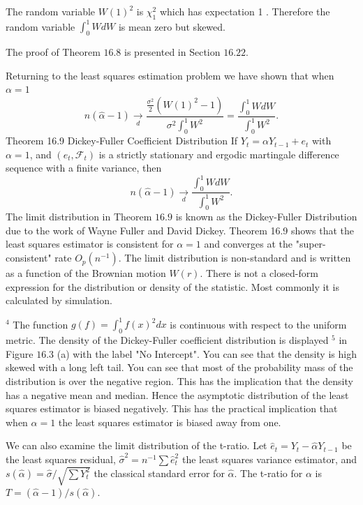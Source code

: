 \documentclass[10pt]{article}
\begin{document}
The random variable $W(1)^{2}$ is $\chi_{1}^{2}$ which has expectation 1 . Therefore the random variable $\int_{0}^{1} W d W$ is mean zero but skewed.

The proof of Theorem $16.8$ is presented in Section $16.22$.

Returning to the least squares estimation problem we have shown that when $\alpha=1$
$$
n(\widehat{\alpha}-1) \underset{d}{\longrightarrow} \frac{\frac{\sigma^{2}}{2}\left(W(1)^{2}-1\right)}{\sigma^{2} \int_{0}^{1} W^{2}}=\frac{\int_{0}^{1} W d W}{\int_{0}^{1} W^{2}} .
$$
Theorem 16.9 Dickey-Fuller Coefficient Distribution If $Y_{t}=\alpha Y_{t-1}+e_{t}$ with $\alpha=1$, and $\left(e_{t}, \mathscr{F}_{t}\right)$ is a strictly stationary and ergodic martingale difference sequence with a finite variance, then
$$
n(\widehat{\alpha}-1) \underset{d}{\longrightarrow} \frac{\int_{0}^{1} W d W}{\int_{0}^{1} W^{2}} .
$$
The limit distribution in Theorem $16.9$ is known as the Dickey-Fuller Distribution due to the work of Wayne Fuller and David Dickey. Theorem 16.9 shows that the least squares estimator is consistent for $\alpha=1$ and converges at the "super-consistent" rate $O_{p}\left(n^{-1}\right)$. The limit distribution is non-standard and is written as a function of the Brownian motion $W(r)$. There is not a closed-form expression for the distribution or density of the statistic. Most commonly it is calculated by simulation.

${ }^{4}$ The function $g(f)=\int_{0}^{1} f(x)^{2} d x$ is continuous with respect to the uniform metric. The density of the Dickey-Fuller coefficient distribution is displayed ${ }^{5}$ in Figure $16.3$ (a) with the label "No Intercept". You can see that the density is high skewed with a long left tail. You can see that most of the probability mass of the distribution is over the negative region. This has the implication that the density has a negative mean and median. Hence the asymptotic distribution of the least squares estimator is biased negatively. This has the practical implication that when $\alpha=1$ the least squares estimator is biased away from one.

We can also examine the limit distribution of the t-ratio. Let $\widehat{e}_{t}=Y_{t}-\widehat{\alpha} Y_{t-1}$ be the least squares residual, $\widehat{\sigma}^{2}=n^{-1} \sum \widehat{e}_{t}^{2}$ the least squares variance estimator, and $s(\widehat{\alpha})=\widehat{\sigma} / \sqrt{\sum Y_{t}^{2}}$ the classical standard error for $\widehat{\alpha}$. The t-ratio for $\alpha$ is $T=(\widehat{\alpha}-1) / s(\widehat{\alpha})$.
\end{document}
